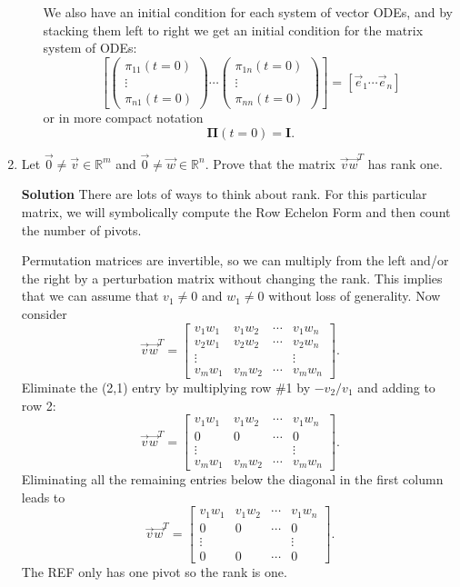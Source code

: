 \documentclass[11pt,fleqn]{article}
\begin{document}
\begin{enumerate}
\begin{itemize}
	We also have an initial condition for each system of vector ODEs, and by stacking them left to right we get an initial condition for the matrix system of ODEs:
	\[\left[\left(\begin{array}{c}\pi_{11}(t=0)\\\vdots\\\pi_{n1}(t=0)\end{array}\right)\cdots\left(\begin{array}{c}\pi_{1n}(t=0)\\\vdots\\\pi_{nn}(t=0)\end{array}\right)\right]= \left[\vec{e}_1\cdots\vec{e}_n\right]\]
	or in more compact notation
	\[\mathbf{\Pi}(t=0) = \mathbf{I}.\]
	\end{itemize}
\item Let $\vec{0}\neq \vec{v}\in\mathbb{R}^m$ and $\vec{0}\neq\vec{w}\in\mathbb{R}^n$. Prove that the matrix $\vec{v}\vec{w}^T$ has rank one. 

{\bf Solution} There are lots of ways to think about rank. For this particular matrix, we will symbolically compute the Row Echelon Form and then count the number of pivots.

Permutation matrices are invertible, so we can multiply from the left and/or the right by a perturbation matrix without changing the rank. This implies that we can assume that $v_1\neq0$ and $w_1\neq 0$ without loss of generality. Now consider
\[\vec{v}\vec{w}^T = \left[\begin{array}{cccc}v_1w_1&v_1w_2&\cdots&v_1w_n\\v_2w_1&v_2w_2&\cdots&v_2w_n\\\vdots&&&\vdots\\v_mw_1&v_mw_2&\cdots&v_mw_n\end{array}\right].\]
Eliminate the (2,1) entry by multiplying row \#1 by $-v_2/v_1$ and adding to row 2:
\[\vec{v}\vec{w}^T = \left[\begin{array}{cccc}v_1w_1&v_1w_2&\cdots&v_1w_n\\0&0&\cdots&0\\\vdots&&&\vdots\\v_mw_1&v_mw_2&\cdots&v_mw_n\end{array}\right].\]
Eliminating all the remaining entries below the diagonal in the first column leads to
\[\vec{v}\vec{w}^T = \left[\begin{array}{cccc}v_1w_1&v_1w_2&\cdots&v_1w_n\\0&0&\cdots&0\\\vdots&&&\vdots\\0&0&\cdots&0\end{array}\right].\]
The REF only has one pivot so the rank is one.


\end{enumerate}
\end{document}
